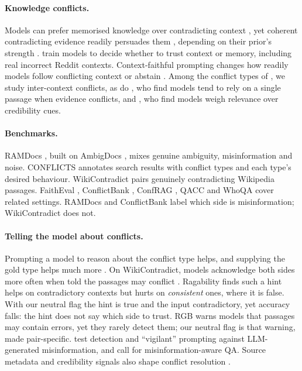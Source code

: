 \paragraph{Knowledge conflicts.}
Models can prefer memorised knowledge over contradicting context \citep{longpre2021entity}, yet coherent contradicting evidence
readily persuades them \citep{xie2024chameleon}, depending on their prior's strength \citep{wu2024clasheval}. \citet{huang2025trust} train models to decide whether to trust context or memory,
including real incorrect Reddit contexts. Context-faithful prompting changes how readily models follow
conflicting context or abstain \citep{zhou2023context}. Among the conflict types of \citet{xu2024survey}, we study inter-context
conflicts, as do \citet{chen2022rich}, who find models tend to rely on a single passage when evidence conflicts,
and \citet{wan2024convincing}, who find models weigh relevance over credibility cues.

\paragraph{Benchmarks.}
RAMDocs \citep{wang2025madam}, built on AmbigDocs \citep{lee2024ambigdocs}, mixes genuine ambiguity, misinformation
and noise. CONFLICTS \citep{cattan2025conflicts} annotates search results with conflict types and each type's
desired behaviour. WikiContradict \citep{hou2024wikicontradict} pairs genuinely contradicting Wikipedia passages.
FaithEval \citep{ming2025faitheval}, ConflictBank \citep{su2024conflictbank}, ConfRAG \citep{yuan2026confrag},
QACC \citep{liu2025qacc} and WhoQA \citep{pham2024whoqa} cover related settings. RAMDocs and ConflictBank label which side is misinformation; WikiContradict does not.

\paragraph{Telling the model about conflicts.}
Prompting a model to reason about the conflict type helps, and supplying the gold type helps much more
\citep{cattan2025conflicts}. On WikiContradict, models acknowledge both sides more often when told the passages may
conflict \citep{hou2024wikicontradict}. Ragability \citep{gross2026ragability} finds such a hint helps on
contradictory contexts but hurts on \emph{consistent} ones, where it is false. With our neutral flag the hint is
true and the input contradictory, yet accuracy falls: the hint does not say which side to trust.
RGB \citep{chen2024rgb} warns models that passages may contain errors, yet they rarely
detect them; our neutral flag is that warning, made pair-specific.
\citet{pan2023risk} test detection and ``vigilant'' prompting against LLM-generated misinformation, and
\citet{pan2023attacking} call for misinformation-aware QA. Source metadata and credibility signals also shape conflict resolution
\citep{chiang2024metadata,ge2025confact}.

